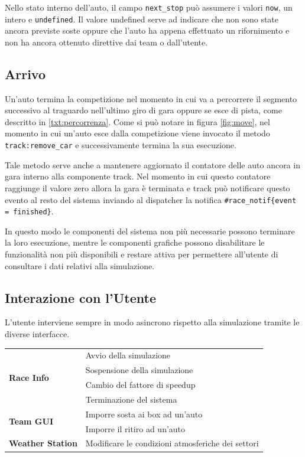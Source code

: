 \documentclass[11pt,a4paper]{report}
\newcommand{\fun}[1]{\texttt{#1}}
\begin{document}
Nello stato interno dell'auto, il campo \fun{next\_stop} può assumere i valori \fun{now}, un intero e \fun{undefined}. Il valore undefined serve ad indicare che non sono state ancora previste soste oppure che l'auto ha appena effettuato un rifornimento e non ha ancora ottenuto direttive dai team o dall'utente.

\subsection{Arrivo}
Un'auto termina la competizione nel momento in cui va a percorrere il segmento successivo al traguardo nell'ultimo giro di gara oppure se esce di pista, come descritto in \ref{txt:percorrenza}. Come si può notare in figura \ref{fig:move}, nel momento in cui un'auto esce dalla competizione viene invocato il metodo \fun{track:remove\_car} e successivamente termina la sua esecuzione.

Tale metodo serve anche a mantenere aggiornato il contatore delle auto ancora in gara interno alla componente track. Nel momento in cui questo contatore raggiunge il valore zero allora la gara è terminata e track può notificare questo evento al resto del sistema inviando al dispatcher la notifica \fun{\#race\_notif\{event = finished\}}.

In questo modo le componenti del sistema non più necessarie possono terminare la loro esecuzione, mentre le componenti grafiche possono disabilitare le funzionalità non più disponibili e restare attiva per permettere all'utente di consultare i dati relativi alla simulazione.
\subsection{Interazione con l'Utente}
L'utente interviene sempre in modo asincrono rispetto alla simulazione tramite le diverse interfacce.
\begin{center}
\begin{tabular}{|l|l|}
\hline
\multirow{4}{*}{\textbf{Race Info}} & Avvio della simulazione\\
& Sospensione della simulazione\\
& Cambio del fattore di speedup\\
& Terminazione del sistema\\
\hline
\multirow{2}{*}{\textbf{Team GUI}} & Imporre sosta ai box ad un'auto\\
& Imporre il ritiro ad un'auto\\
\hline
\textbf{Weather Station} & Modificare le condizioni atmosferiche dei settori\\
\hline
\end{tabular}
\end{center}
\end{document}
